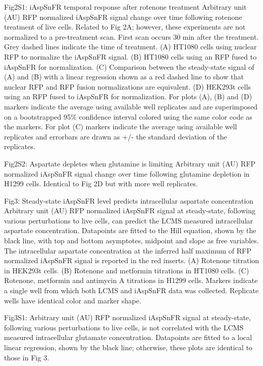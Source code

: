 \documentclass[9pt,lineno]{elife}
\begin{document}
Fig2S1:
iAspSnFR temporal response after rotenone treatment
Arbitrary unit (AU) RFP normalized iAspSnFR signal change over time following rotenone treatment of live cells. Related to Fig 2A; however, these experiments are not normalized to a pre-treatment scan. First scan occurs 30 min after the treatment. Grey dashed lines indicate the time of treatment. (A) HT1080 cells using nuclear RFP to normalize the iAspSnFR signal. (B) HT1080 cells using an RFP fused to iAspSnFR for normalization. (C) Comparison between the steady-state signal of (A) and (B) with a linear regression shown as a red dashed line to show that nuclear RFP and RFP fusion normalizations are equivalent. (D) HEK293t cells using an RFP fused to iAspSnFR for normalization. For plots (A), (B) and (D) markers indicate the average using available well replicates and are superimposed on a bootstrapped 95\% confidence interval colored using the same color code as the markers. For plot (C) markers indicate the average using available well replicates and errorbars are drawn as +/- the standard deviation of the replicates.


Fig2S2:
Aspartate depletes when glutamine is limiting
Arbitrary unit (AU) RFP normalized iAspSnFR signal change over time following glutamine depletion in H1299 cells. Identical to Fig 2D but with more well replicates.


Fig3:
Steady-state iAspSnFR level predicts intracellular aspartate concentration
Arbitrary unit (AU) RFP normalized iAspSnFR signal at steady-state, following various perturbations to live cells, can predict the LCMS measured intracellular aspartate concentration. Datapoints are fitted to the Hill equation, shown by the black line, with top and bottom asymptotes, midpoint and slope as free variables. The intracellular aspartate concentration at the inferred half maximum of RFP normalized iAspSnFR signal is reported in the red inserts. (A) Rotenone titration in HEK293t cells. (B) Rotenone and metformin titrations in HT1080 cells. (C) Rotenone, metformin and antimycin A titrations in H1299 cells. Markers indicate a single well from which both LCMS and iAspSnFR data was collected. Replicate wells have identical color and marker shape.


Fig3S1:
Arbitrary unit (AU) RFP normalized iAspSnFR signal at steady-state, following various perturbations to live cells, is not correlated with the LCMS measured intracellular glutamate concentration. Datapoints are fitted to a local linear regression, shown by the black line; otherwise, these plots are identical to those in Fig 3.
\end{document}
